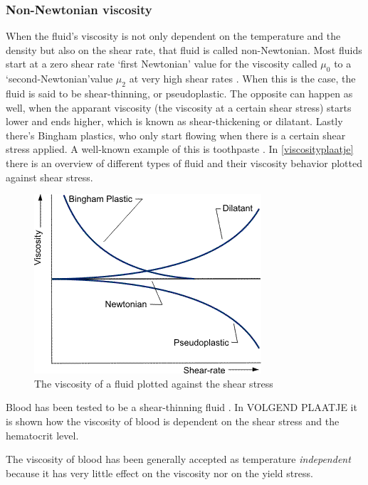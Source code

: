 \subsubsection{Non-Newtonian viscosity}
When the fluid's viscosity is not only dependent on the temperature and the density but also on the shear rate, that fluid is called non-Newtonian. Most fluids start at a zero shear rate `first Newtonian' value for the viscosity called $\mu_{0}$ to a `second-Newtonian'value $\mu_{2}$ at very high shear rates \cite{nonnewtsimulation}. When this is the case, the fluid is said to be shear-thinning, or pseudoplastic. The opposite can happen as well, when the apparant viscosity (the viscosity at a certain shear stress) starts lower and ends higher, which is known as shear-thickening or dilatant. Lastly there's Bingham plastics, who only start flowing when there is a certain shear stress applied. A well-known example of this is toothpaste \cite{FT}. In \autoref{viscosityplaatje} there is an overview of different types of fluid and their viscosity behavior plotted against shear stress.
\begin{figure}[hb]
\centering
\includegraphics{viscosityshearstress.png}
\caption{The viscosity of a fluid plotted against the shear stress \cite{viscositypicture}}
\label{viscosityplaatje}
\end{figure}
Blood has been tested to be a shear-thinning fluid \cite{bloodthinning}. In VOLGEND PLAATJE it is shown how the viscosity of blood is dependent on the shear stress and the hematocrit level. 
 
The viscosity of blood has been generally accepted as temperature \emph{independent} because it has very little effect on the viscosity nor on the yield stress\cite{rheologyofblood}.



